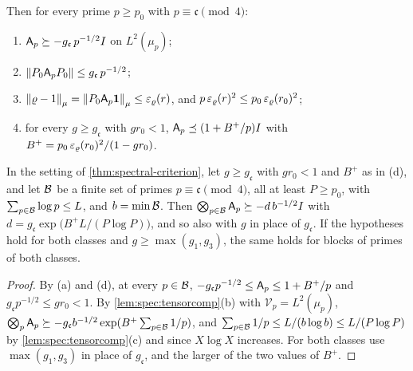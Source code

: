 \begin{theorem}
\[\]
Then for every prime $p\ge p_0$ with $p\equiv\mathfrak c\pmod4$:
\begin{enumerate}[label=\textup{(\alph*)}]
\item $\mathsf A_p\succeq-g_{\mathfrak c}\,p^{-1/2}I$ on $L^2(\mu_p)$;
\item $\left\|P_0\mathsf A_p P_0\right\|\le g_{\mathfrak c}\,p^{-1/2}$;
\item $\left\|\varrho-1\right\|_\mu=\left\|P_0\mathsf A_p\mathbf 1\right\|_\mu\le\varepsilon_\varrho(r)$, and
  $p\,\varepsilon_\varrho(r)^2\le p_0\,\varepsilon_\varrho(r_0)^2$;
\item for every $g\ge g_{\mathfrak c}$ with $gr_0<1$, $\mathsf A_p\preceq(1+B^+/p)I$ with
  $B^+=p_0\,\varepsilon_\varrho(r_0)^2/(1-gr_0)$.
\end{enumerate}
\end{theorem}

\begin{corollary}[Blocks]\label{cor:spectral-criterion-blocks}
In the setting of \cref{thm:spectral-criterion}, let $g\ge g_{\mathfrak c}$ with $gr_0<1$
and $B^+$ as in \textup{(d)}, and let $\mathcal B$ be a finite set of primes
$p\equiv\mathfrak c\pmod4$, all at least $P\ge p_0$, with $\sum_{p\in\mathcal B}\log p\le L$, and
$b=\min\mathcal B$. Then $\bigotimes_{p\in\mathcal B}\mathsf A_p\succeq-d\,b^{-1/2}I$ with
$d=g_{\mathfrak c}\exp\big(B^+L/(P\log P)\big)$, and so also with $g$ in place of
$g_{\mathfrak c}$. If the hypotheses hold for both classes and $g\ge\max(g_1,g_3)$, the
same holds for blocks of primes of both classes.
\end{corollary}

\begin{proof}
By (a) and (d), at every $p\in\mathcal B$,
$-g_{\mathfrak c}p^{-1/2}\le\mathsf A_p\le1+B^+/p$ and $g_{\mathfrak c}p^{-1/2}\le gr_0<1$. By
\cref{lem:spec:tensorcomp}(b) with $\mathcal V_p=L^2(\mu_p)$,
$\bigotimes_p\mathsf A_p\succeq-g_{\mathfrak c}b^{-1/2}\exp(B^+\sum_{p\in\mathcal B}1/p)$, and
$\sum_{p\in\mathcal B}1/p\le L/(b\log b)\le L/(P\log P)$ by \cref{lem:spec:tensorcomp}(c) and
since $X\log X$ increases. For both classes use $\max(g_1,g_3)$ in place of
$g_{\mathfrak c}$, and the larger of the two values of $B^+$.
\end{proof}

